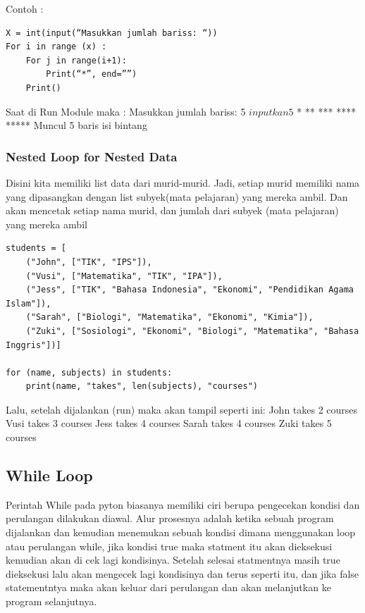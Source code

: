 Contoh :
\begin{verbatim}
X = int(input(“Masukkan jumlah bariss: “))
For i in range (x) :
	For j in range(i+1):
		Print(“*”, end=””)
	Print()
\end{verbatim}
Saat di Run Module maka :
Masukkan jumlah bariss: 5 \(inputkan 5\)
*
**
***
****
***** 
Muncul 5 baris isi bintang

\subsubsection{Nested Loop for Nested Data}
Disini kita memiliki list data dari murid-murid. Jadi, setiap murid memiliki nama yang dipasangkan dengan list subyek(mata pelajaran) yang mereka ambil. Dan akan mencetak setiap nama murid, dan jumlah dari subyek (mata pelajaran) yang mereka ambil
\begin{verbatim}
students = [
    ("John", ["TIK", "IPS"]),
    ("Vusi", ["Matematika", "TIK", "IPA"]),
    ("Jess", ["TIK", "Bahasa Indonesia", "Ekonomi", "Pendidikan Agama Islam"]),
    ("Sarah", ["Biologi", "Matematika", "Ekonomi", "Kimia"]),
    ("Zuki", ["Sosiologi", "Ekonomi", "Biologi", "Matematika", "Bahasa Inggris"])]

for (name, subjects) in students:
    print(name, "takes", len(subjects), "courses")
\end{verbatim}
Lalu, setelah dijalankan (run) maka akan tampil seperti ini:
John takes 2 courses
Vusi takes 3 courses
Jess takes 4 courses
Sarah takes 4 courses
Zuki takes 5 courses

\subsection{While Loop}
Perintah While pada pyton biasanya memiliki ciri berupa pengecekan kondisi dan perulangan dilakukan diawal\cite{santoso2009bahasa}. Alur prosesnya adalah ketika sebuah program dijalankan dan kemudian menemukan sebuah kondisi dimana menggunakan loop atau perulangan while, jika kondisi true maka statment itu akan dieksekusi kemudian akan di cek lagi kondisinya. Setelah selesai statmentnya masih true dieksekusi lalu akan mengecek lagi kondisinya dan terus seperti itu, dan jika false statementntya maka akan keluar dari perulangan dan akan melanjutkan ke program selanjutnya.

